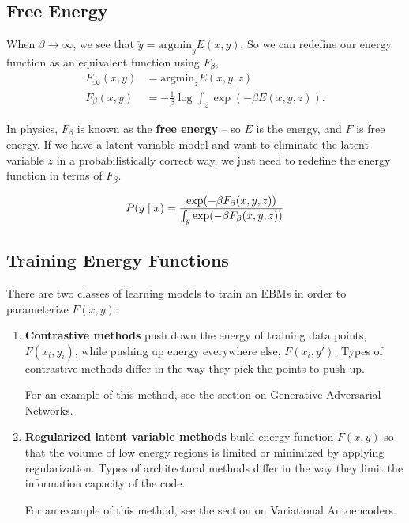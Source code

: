 \documentclass{article}
\begin{document}
\subsection{Free Energy}

When $\beta \rightarrow \infty$, we see that $\check{y} = \text{argmin}_{y} E(x,y)$. So we can redefine our energy function as an equivalent function using $F_\beta$,
\begin{align*}
    F_{\infty} (x,y) &= \text{argmin}_z E(x,y,z)\\
    F_{\beta} (x,y) &= -\frac{1}{\beta} \log \int_z \exp(-\beta E(x,y,z)).
\end{align*}

In physics, $F_\beta$ is known as the \textbf{free energy} -- so $E$ is the energy, and $F$ is free energy. If we have a latent variable model and want to eliminate the latent variable $z$ in a probabilistically correct way, we just need to redefine the energy function in terms of $F_\beta$. 

\[
    P(y \mid x) = \frac{ \exp(-\beta F_\beta(x,y,z)) }{ \int_y \exp(-\beta F_\beta(x, y, z))} \\
\]

\subsection{Training Energy Functions}

There are two classes of learning models to train an EBMs in order to parameterize $F(x, y)$:

\begin{enumerate}
    \item \textbf{Contrastive methods} push down the energy of training data points, $F(x_i, y_i)$, while pushing up energy everywhere else, $F(x_i, y')$. Types of contrastive methods differ in the way they pick the points to push up.
    
    For an example of this method, see the section on Generative Adversarial Networks.
    
    \item \textbf{Regularized latent variable methods} build energy function $F(x, y)$ so that the volume of low energy regions is limited or minimized by applying regularization. Types of architectural methods differ in the way they limit the information capacity of the code.
    
    For an example of this method, see the section on Variational Autoencoders.
\end{enumerate}
\end{document}
